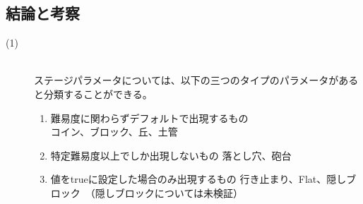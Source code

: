 \documentclass[a4j]{jarticle}
\begin{document}
\subsection{結論と考察}
\begin{description}
\item[(1)]~\\
ステージパラメータについては、以下の三つのタイプのパラメータがあると分類することができる。
\begin{enumerate}
\item 難易度に関わらずデフォルトで出現するもの ~\\
コイン、ブロック、丘、土管
\item 特定難易度以上でしか出現しないもの
落とし穴、砲台
\item 値をtrueに設定した場合のみ出現するもの
行き止まり、Flat、隠しブロック　（隠しブロックについては未検証）
\end{enumerate}


\end{description}
\end{document}
